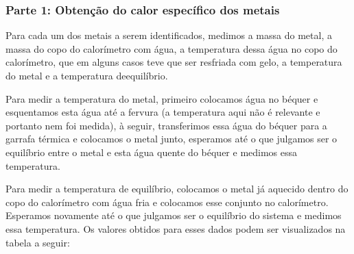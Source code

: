 \documentclass[a4paper]{article}
\begin{document}
			\subsubsection{Parte 1: Obtenção do calor específico dos metais}

				Para cada um dos metais a serem identificados, medimos a massa do
				metal, a massa do copo do calorímetro com água, a temperatura dessa
				água no copo do calorímetro, que em alguns casos teve que ser resfriada
				com gelo, a temperatura do metal e a temperatura deequilíbrio.
	
				Para medir a temperatura do metal, primeiro colocamos água no béquer
				e esquentamos esta água até a fervura (a temperatura aqui não é relevante
				e portanto nem foi medida), à seguir, transferimos essa água do béquer
				para a garrafa térmica e colocamos o metal junto, esperamos até o
				que julgamos ser o equilíbrio entre o metal e esta água quente do
				béquer e medimos essa temperatura.
	
				Para medir a temperatura de equilíbrio, colocamos o metal já aquecido
				dentro do copo do calorímetro com água fria e colocamos esse conjunto
				no calorímetro. Esperamos novamente até o que julgamos ser o equilíbrio
				do sistema e medimos essa temperatura. Os valores obtidos para esses
				dados podem ser visualizados na tabela a seguir:
	
\end{document}
